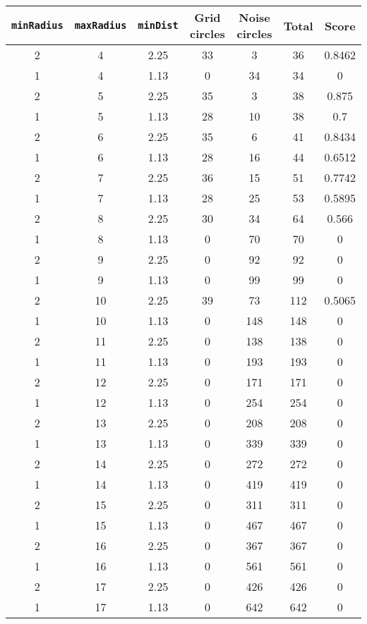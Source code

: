 \documentclass[letterpaper, 12pt]{article}
\begin{document}
\begin{longtable}{|c|c|c|c|c|c|c|}
\hline
\textbf{\texttt{minRadius}} & \textbf{\texttt{maxRadius}} & \textbf{\texttt{minDist}} & \textbf{Grid circles} & \textbf{Noise circles} & \textbf{Total} & \textbf{Score} \\
\hline
2 & 4 & 2.25 & 33 & 3 & 36 & 0.8462 \\
\hline
1 & 4 & 1.13 & 0 & 34 & 34 & 0 \\
\hline
2 & 5 & 2.25 & 35 & 3 & 38 & 0.875 \\
\hline
1 & 5 & 1.13 & 28 & 10 & 38 & 0.7 \\
\hline
2 & 6 & 2.25 & 35 & 6 & 41 & 0.8434 \\
\hline
1 & 6 & 1.13 & 28 & 16 & 44 & 0.6512 \\
\hline
2 & 7 & 2.25 & 36 & 15 & 51 & 0.7742 \\
\hline
1 & 7 & 1.13 & 28 & 25 & 53 & 0.5895 \\
\hline
2 & 8 & 2.25 & 30 & 34 & 64 & 0.566 \\
\hline
1 & 8 & 1.13 & 0 & 70 & 70 & 0 \\
\hline
2 & 9 & 2.25 & 0 & 92 & 92 & 0 \\
\hline
1 & 9 & 1.13 & 0 & 99 & 99 & 0 \\
\hline
2 & 10 & 2.25 & 39 & 73 & 112 & 0.5065 \\
\hline
1 & 10 & 1.13 & 0 & 148 & 148 & 0 \\
\hline
2 & 11 & 2.25 & 0 & 138 & 138 & 0 \\
\hline
1 & 11 & 1.13 & 0 & 193 & 193 & 0 \\
\hline
2 & 12 & 2.25 & 0 & 171 & 171 & 0 \\
\hline
1 & 12 & 1.13 & 0 & 254 & 254 & 0 \\
\hline
2 & 13 & 2.25 & 0 & 208 & 208 & 0 \\
\hline
1 & 13 & 1.13 & 0 & 339 & 339 & 0 \\
\hline
2 & 14 & 2.25 & 0 & 272 & 272 & 0 \\
\hline
1 & 14 & 1.13 & 0 & 419 & 419 & 0 \\
\hline
2 & 15 & 2.25 & 0 & 311 & 311 & 0 \\
\hline
1 & 15 & 1.13 & 0 & 467 & 467 & 0 \\
\hline
2 & 16 & 2.25 & 0 & 367 & 367 & 0 \\
\hline
1 & 16 & 1.13 & 0 & 561 & 561 & 0 \\
\hline
2 & 17 & 2.25 & 0 & 426 & 426 & 0 \\
\hline
1 & 17 & 1.13 & 0 & 642 & 642 & 0 \\

\end{longtable}
\end{document}
